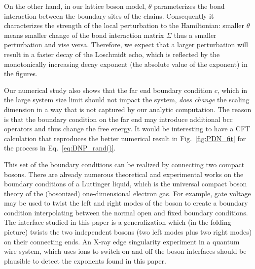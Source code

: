 On the other hand, in our lattice boson model, $\theta$ parameterizes the bond interaction between the boundary sites of the chains. Consequently it characterizes the strength of the local perturbation to the Hamiltonian: smaller $\theta$ means smaller change of the bond interaction matrix $\Sigma$ thus a smaller perturbation and vise versa. Therefore, we expect that a larger perturbation will result in a faster decay of the Loschmidt echo, which is reflected by the monotonically increasing decay exponent (the absolute value of the exponent) in the figures.

Our numerical study also shows that the far end boundary condition $c$, which in the large system size limit should not impact the system, {\it does change} the scaling dimension in a way that is not captured by our analytic computation. The reason is that the boundary condition on the far end may introduce additional bcc operators and thus change the free energy. It would be interesting to have a CFT calculation that reproduces the better numerical result in Fig.~\ref{fig:PDN_fit} for the process in Eq.~\eqref{eq:DNP_rand()}. 


This set of the boundary conditions can be realized by connecting two compact bosons. There are already numerous theoretical and experimental works on the boundary conditions of a Luttinger liquid\cite{schmeltzer_zero_1999,anfuso_luttinger_2003,voit_bounded_2000,fabrizio_interacting_1995,egger_applying_1998}, which is the universal compact boson theory of the (bosonized) one-dimensional electron gas\cite{giamarchi_quantum_2015}. For example, gate voltage \cite{egger_applying_1998} may be used to twist the left and right modes of the boson to create a boundary condition interpolating between the normal open and fixed boundary conditions. The interface studied in this paper is a generalization which (in the folding picture) twists the two independent bosons (two left modes plus two right modes) on their connecting ends. An X-ray edge singularity experiment in a quantum wire system, which uses ions to switch on and off the boson interfaces should be plausible to detect the exponents found in this paper. 


